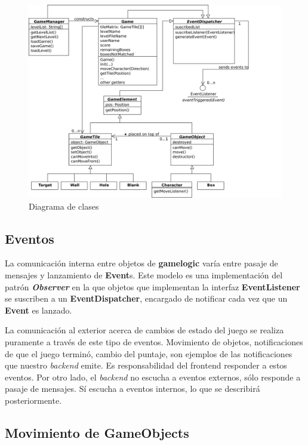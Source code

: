 \documentclass[a4paper,12pt,titlepage]{article}
\begin{document}
\begin{center}
	\begin{figure}[h]
		\center \includegraphics{ClassDiagram.png}
		\caption{Diagrama de clases}
	\end{figure}
\end{center}

\subsection{Eventos}

La comunicación interna entre objetos de \textbf{gamelogic} varía entre pasaje de mensajes y lanzamiento de \textbf{Event}s. Este modelo es una implementación del patrón \textbf{\emph{Observer}} en la que objetos que implementan la interfaz \textbf{EventListener} se suscriben a un \textbf{EventDispatcher}, encargado de notificar cada vez que un \textbf{Event} es lanzado.

La comunicación al exterior acerca de cambios de estado del juego se realiza puramente a través de este tipo de eventos. Movimiento de objetos, notificaciones de que el juego terminó, cambio del puntaje, son ejemplos de las notificaciones que nuestro \emph{backend} emite. Es responsabilidad del frontend responder a estos eventos. Por otro lado, el \emph{backend} no escucha a eventos externos, sólo responde a pasaje de mensajes. Sí escucha a eventos internos, lo que se describirá posteriormente.

\subsection{Movimiento de \textbf{GameObject}s}
\end{document}
